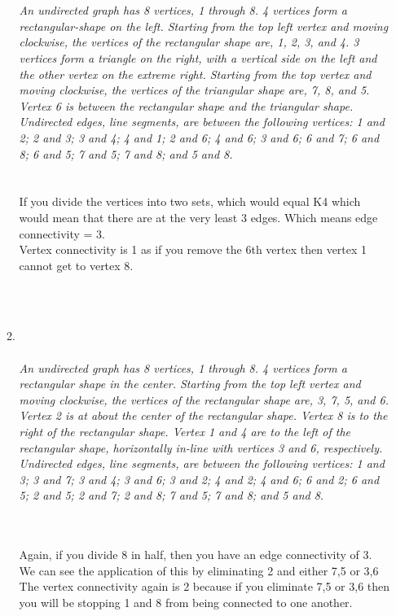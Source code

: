 \begin{enumerate}[label=(\alph*)]
\begin{enumerate}[label=(\roman*)]
{}
\\\\
{\color{blue}{\bf Figure 7:} \emph{An undirected graph has 8 vertices, 1 through 8. 4 vertices form a rectangular-shape on the left. Starting from the top left vertex and moving clockwise, the vertices of the rectangular shape are, 1, 2, 3, and 4. 3 vertices form a triangle on the right, with a vertical side on the left and the other vertex on the extreme right. Starting from the top vertex and moving clockwise, the vertices of the triangular shape are, 7, 8, and 5. Vertex 6 is between the rectangular shape and the triangular shape. Undirected edges, line segments, are between the following vertices: 1 and 2; 2 and 3; 3 and 4; 4 and 1; 2 and 6; 4 and 6; 3 and 6; 6 and 7; 6 and 8; 6 and 5; 7 and 5; 7 and 8; and 5 and 8.
\\
}
}
\\
\\
If you divide the vertices into two sets, which would equal K4 which would mean that there are at the very least 3 edges. Which means edge connectivity = 3. \\

Vertex connectivity is 1 as if you remove the 6th vertex then vertex 1 cannot get to vertex 8.


\\\\
\newpage
\item  

\\\\
{\color{blue}{\bf Figure 8:} \emph{An undirected graph has 8 vertices, 1 through 8. 4 vertices form a rectangular shape in the center. Starting from the top left vertex and moving clockwise, the vertices of the rectangular shape are, 3, 7, 5, and 6. Vertex 2 is at about the center of the rectangular shape. Vertex 8 is to the right of the rectangular shape. Vertex 1 and 4 are to the left of the rectangular shape, horizontally in-line with vertices 3 and 6, respectively. Undirected edges, line segments, are between the following vertices: 1 and 3; 3 and 7; 3 and 4; 3 and 6; 3 and 2; 4 and 2; 4 and 6; 6 and 2; 6 and 5; 2 and 5; 2 and 7; 2 and 8; 7 and 5; 7 and 8; and 5 and 8. 
\\
}
\\
\\}

Again, if you divide 8 in half, then you have an edge connectivity of 3. We can see the application of this by eliminating 2 and either 7,5 or 3,6
\\

The vertex connectivity again is 2 because if you eliminate 7,5 or 3,6 then you will be stopping 1 and 8 from being connected to one another.
\\\\
    \end{enumerate}
\end{enumerate}



